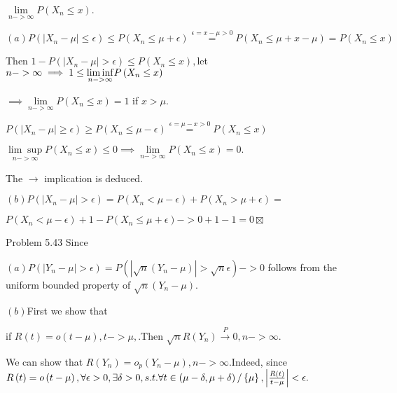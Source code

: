 \documentclass{article}
\begin{document}
$\underset{n->\infty }{\lim }P\left( X_{n}\leq x\right) .$

$\left( a\right) P\left( \left\vert X_{n}-\mu \right\vert \leq \epsilon
\right) \leq P\left( X_{n}\leq \mu +\epsilon \right) \overset{\epsilon
=x-\mu >0}{=}P\left( X_{n}\leq \mu +x-\mu \right) =P\left( X_{n}\leq
x\right) $

Then $1-P\left( \left\vert X_{n}-\mu \right\vert >\epsilon \right) \leq
P\left( X_{n}\leq x\right) ,$let $n->\infty \implies 1\leq \underset{%
n->\infty }{\lim \inf }P\left( X_{n}\leq x\right) $

$\implies \underset{n->\infty }{\lim }P\left( X_{n}\leq x\right) =1$ if $%
x>\mu .$

$P\left( \left\vert X_{n}-\mu \right\vert \geq \epsilon \right) \geq P\left(
X_{n}\leq \mu -\epsilon \right) \overset{\epsilon =\mu -x>0}{=}P\left(
X_{n}\leq x\right) $

\bigskip $\underset{n->\infty }{\lim \sup }P\left( X_{n}\leq x\right) \leq
0\implies \underset{n->\infty }{\lim }P\left( X_{n}\leq x\right) =0.$

The $\rightarrow $ implication is deduced.

$\left( b\right) P\left( \left\vert X_{n}-\mu \right\vert >\epsilon \right)
=P\left( X_{n}<\mu -\epsilon \right) +P\left( X_{n}>\mu +\epsilon \right) =$

$P\left( X_{n}<\mu -\epsilon \right) +1-P\left( X_{n}\leq \mu +\epsilon
\right) ->0+1-1=0\boxtimes $

\bigskip 

Problem 5.43 Since 

$\left( a\right) P\left( \left\vert Y_{n}-\mu \right\vert >\epsilon \right)
=P\left( \left\vert \sqrt{n}\left( Y_{n}-\mu \right) \right\vert >\sqrt{n}%
\epsilon \right) ->0$ follows from the  uniform bounded property of $\sqrt{n}%
\left( Y_{n}-\mu \right) .$

$\left( b\right) $First we show that

if $R\left( t\right) =o\left( t-\mu \right) ,t->\mu ,.$Then $\sqrt{n}R\left(
Y_{n}\right) \overset{P}{\rightarrow }0,n->\infty .$

We can show that $R\left( Y_{n}\right) =o_{p}\left( Y_{n}-\mu \right)
,n->\infty .$Indeed, since $R\left( t\right) =o\left( t-\mu \right) ,\forall
\epsilon >0,\exists \delta >0,s.t.\forall t\in \left( \mu -\delta ,\mu
+\delta \right) /\left\{ \mu \right\} ,\left\vert \frac{R\left( t\right) }{%
t-\mu }\right\vert <\epsilon .$
\end{document}
